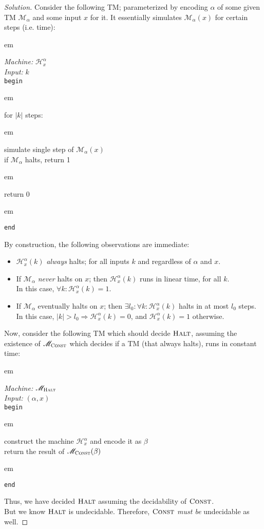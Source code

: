 \documentclass[usletter]{article}
\newcommand {\machine}[1]      {\ensuremath{\mathscr{#1}}}
\newcommand {\namedlangset}[1] {\ensuremath{\textnormal{\textsc{#1}}}}
\newcommand {\indpar}[1]   {
  \par\leftskip=#1em
  \noindent\ignorespaces
}
\newenvironment{turing}[2] {
  \smallskip
  \indpar{2}
  \textit{Machine:} #1\\
  \textit{Input:} $#2$\\[5pt]
  \texttt{begin}
  \parskip=0pt
  \indpar{3}
}{
  \indpar{2}
  \texttt{end}
  \par\medskip
}
\newcommand{\ie}{\textnormal{i.e. }}
\newcommand {\machineM}       {\machine{M}}
\begin{document}
\begin{enumerate}[labelsep=2.5em, label=\textbf{\arabic{enumi}}]
\begin{proof}[Solution]
    Consider the following TM; parameterized by encoding $\alpha$ of some given
    TM $\machineM_\alpha$ and some input $x$ for it. It essentially simulates
    $\machineM_\alpha(x)$ for certain steps (\ie time):
    \begin{turing}{$\machine{H}^\alpha_x$}{k}
      for $|k|$ steps:
        \indpar{4}
        simulate single step of $\machineM_\alpha(x)$ \\
        if $\machineM_\alpha$ halts, return 1
      \indpar{3}
      return 0
    \end{turing}

    By construction, the following observations are immediate:
    \begin{itemize}
      \item $\machine{H}^\alpha_x(k)$ \textit{always} halts; for all inputs $k$
            and regardless of $\alpha$ and $x$.
      \item If $\machineM_\alpha$ \textit{never} halts on $x$;
            then $\machine{H}^\alpha_x(k)$ runs in linear time, for all $k$. \\
            In this case, $\forall k : \machine{H}^\alpha_x(k) = 1$.
      \item If $\machineM_\alpha$ eventually halts on $x$;
            then $\exists l_0 : \forall k : \machine{H}^\alpha_x(k)$ halts in
            at most $l_0$ steps. \\
            In this case, $|k| > l_0 \Rightarrow \machine{H}^\alpha_x(k) = 0$,
            and $\machine{H}^\alpha_x(k) = 1$ otherwise.
    \end{itemize}

    Now, consider the following TM which should decide \namedlangset{Halt},
    assuming the existence of $\machineM_\namedlangset{Const}$ which decides if
    a TM (that always halts), runs in constant time:
    \begin{turing}{$\machineM_\namedlangset{Halt}$}{(\alpha, x)}
      construct the machine $\machine{H}^\alpha_x$ and encode it as $\beta$\\
      return the result of $\machineM_\namedlangset{Const}(\beta)$
    \end{turing}

    Thus, we have decided \namedlangset{Halt} assuming the decidability of
    \namedlangset{Const}. \\
    But we know \namedlangset{Halt} is undecidable.
    Therefore, \namedlangset{Const} \textit{must be} undecidable as well.
  \end{proof}


\end{enumerate}
\end{document}
